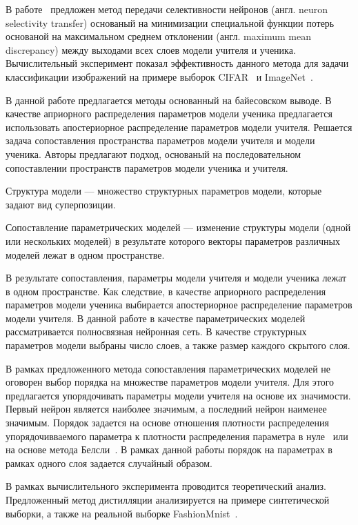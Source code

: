 В работе~\cite{Zehao2017} предложен метод передачи селективности нейронов (англ. neuron selectivity transfer) основаный на минимизации специальной функции потерь основаной на максимальном среднем отклонении (англ. maximum mean discrepancy) между выходами всех слоев модели учителя и ученика. Вычислительный эксперимент показал эффективность данного метода для задачи классификации изображений на примере выборок CIFAR~\cite{cifar10} и ImageNet~\cite{imagenet}.

В данной работе предлагается методы основанный на байесовском выводе.
В качестве априорного распределения параметров модели ученика предлагается использовать апостериорное распределение параметров модели учителя.
Решается задача сопоставления пространства параметров модели учителя и модели ученика.
Авторы предлагают подход, основаный на последовательном сопоставлении пространств параметров модели ученика и учителя. 
\begin{definition}
\label{def:structure}
Структура модели --- множество структурных параметров модели, которые задают вид суперпозиции.
\end{definition}
\begin{definition}
\label{def:sopos}
Сопоставление параметрических моделей --- изменение структуры модели (одной или нескольких моделей) в результате которого векторы параметров различных моделей лежат в одном пространстве.
\end{definition}
В результате сопоставления, параметры модели учителя и модели ученика лежат в одном пространстве.
Как следствие, в качестве априорного распределения параметров модели ученика выбирается апостериорное распределение параметров модели учителя.
В данной работе в качестве параметрических моделей рассматривается полносвязная нейронная сеть.
В качестве структурных параметров модели выбраны число слоев, а также размер каждого скрытого слоя.

В рамках предложенного метода сопоставления параметрических моделей не оговорен выбор порядка на множестве параметров модели учителя.
Для этого предлагается упорядочивать параметры модели учителя на основе их значимости.
Первый нейрон является наиболее значимым, а последний нейрон наименее значимым.
Порядок задается на основе отношения плотности распределения упорядочивваемого параметра к плотности распределения параметра в нуле~\cite{graves2011} или на основе метода Белсли~\cite{grabovoy2019}.
В рамках данной работы порядок на параметрах в рамках одного слоя задается случайный образом.

В рамках вычислительного эксперимента проводится теоретический анализ. Предложенный метод дистилляции анализируется на примере синтетической выборки, а также на реальной выборке FashionMnist~\cite{fashionmnist}.

